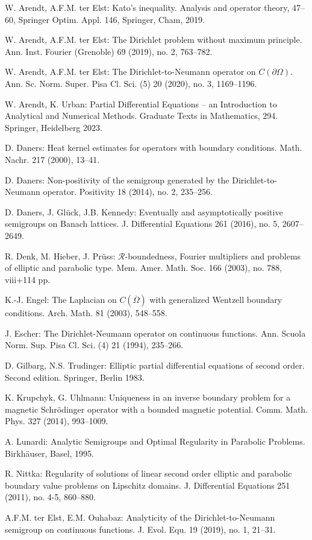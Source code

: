 \begin{thebibliography}{99}
 W. Arendt, A.F.M. ter Elst: Kato's inequality. Analysis and operator theory, 47--60, Springer Optim. Appl. 146, Springer, Cham, 2019.

 W. Arendt, A.F.M. ter Elst: The Dirichlet problem without maximum principle. Ann. Inst. Fourier (Grenoble) 69 (2019), no. 2, 763--782.

 W. Arendt, A.F.M. ter Elst: The Dirichlet-to-Neumann operator on $C(\partial\Omega)$. Ann. Sc. Norm. Super. Pisa Cl. Sci. (5) 20 (2020), no. 3, 1169--1196.

 W. Arendt, K. Urban: Partial Differential Equations -- an Introduction to Analytical and Numerical Methods. Graduate Texts in Mathematics, 294. Springer, Heidelberg 2023.

 D. Daners: Heat kernel estimates for operators with boundary conditions. Math. Nachr. 217 (2000), 13--41.

 D. Daners: Non-positivity of the semigroup generated by the Dirichlet-to-Neumann operator. Positivity 18 (2014), no. 2, 235--256.

 D. Daners, J. Glück, J.B. Kennedy: Eventually and asymptotically positive semigroups on Banach lattices. J. Differential Equations 261 (2016), no. 5, 2607--2649.

 R. Denk, M. Hieber, J. Prüss: $\mathcal{R}$-boundedness, Fourier multipliers and problems of elliptic and parabolic type. Mem. Amer. Math. Soc. 166 (2003), no. 788, viii+114 pp.

 K.-J. Engel: The Laplacian on $C(\overline{\Omega})$ with generalized Wentzell boundary conditions. Arch. Math. 81 (2003), 548--558.

 J. Escher: The Dirichlet-Neumann operator on continuous functions. Ann. Scuola Norm. Sup. Pisa Cl. Sci. (4) 21 (1994), 235--266.

 D. Gilbarg, N.S. Trudinger: Elliptic partial differential equations of second order. Second edition. Springer, Berlin 1983.

 K. Krupchyk, G. Uhlmann: Uniqueness in an inverse boundary problem for a magnetic Schrödinger operator with a bounded magnetic potential. Comm. Math. Phys. 327 (2014), 993--1009.

 A. Lunardi: Analytic Semigroups and Optimal Regularity in Parabolic Problems. Birkhäuser, Basel, 1995.

 R. Nittka: Regularity of solutions of linear second order elliptic and parabolic boundary value problems on Lipschitz domains. J. Differential Equations 251 (2011), no. 4-5, 860--880.

 A.F.M. ter Elst, E.M. Ouhabaz: Analyticity of the Dirichlet-to-Neumann semigroup on continuous functions. J. Evol. Equ. 19 (2019), no. 1, 21--31.

\end{thebibliography}

%